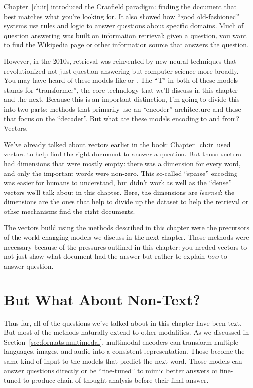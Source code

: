 Chapter~\ref{ch:ir} introduced the Cranfield paradigm: finding the
document that best matches what you're looking for.  It also showed
how ``good old-fashioned''  systems use rules and logic to
answer questions about specific domains.
%
Much of question answering was built on information retrieval: given a
question, you want to find the Wikipedia page or other information
source that answers the question.

However, in the 2010s, retrieval was reinvented by new neural
techniques that revolutionized not just question answering but
computer science more broadly.
%
You may have heard of these models like  or .
%
The ``T'' in both of these models stands for ``transformer'', the core technology that we'll discuss in this chapter and the next.
%
Because this is an important distinction, I'm going to divide this into two parts: methods that primarily use an ``encoder'' architecture and those that focus on the ``decoder''.  
%
But what are these models encoding to and from?  
%
Vectors.

We've already talked about vectors earlier in the book: Chapter~\ref{ch:ir} used vectors to help find the right document to answer a question. 
%
But those vectors had dimensions that were mostly empty: there was a dimension for every word, and only the important words were non-zero.  
%
This so-called ``sparse'' encoding was easier for humans to understand, but didn't work as well as the ``dense'' vectors we'll talk about in this chapter.
%
Here, the dimensions are \emph{learned}: the dimensions are the ones that help to divide up the dataset to help the retrieval or other mechanisms find the right documents.

The vectors build using the methods described in this chapter were the precursors of the world-changing models
we discuss in the next chapter.
% 
Those methods were necessary because of the pressures outlined in this chapter: you needed vectors to not just show what document had the answer but rather to explain \emph{how} to answer question.


\section{But What About Non-Text?}
\label{sec:methods:multimodal}

Thus far, all of the questions we've talked about in this chapter have been text.  But most of the methods naturally extend to other modalities.  As we discussed in Section~\ref{sec:formats:multimodal}, multimodal encoders can transform multiple languages, images, and audio into a consistent representation.  Those become the same kind of input to the models that predict the next word.  Those models can answer questions directly or be ``fine-tuned'' to mimic better answers or fine-tuned to produce chain of thought analysis before their final answer.


